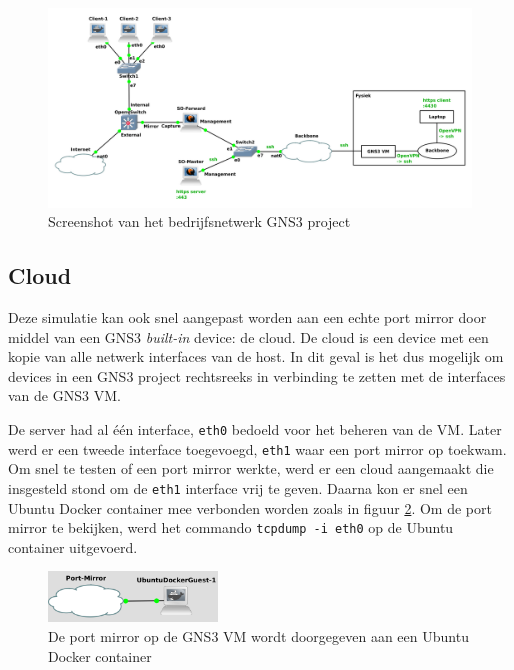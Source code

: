 \documentclass[a4paper,12pt]{report}
\begin{document}
\begin{figure}[H]
  \centering
  \includegraphics[width=\textwidth]{gns3-simulatie-bedrijf}
  \caption{Screenshot van het bedrijfsnetwerk GNS3 project}
  \label{fig:gns3-simulatie-bedrijf}
\end{figure}

\subsection{Cloud}
Deze simulatie kan ook snel aangepast worden aan een echte port mirror door middel van een GNS3 \emph{built-in} device: de cloud.
De cloud is een device met een kopie van alle netwerk interfaces van de host.
In dit geval is het dus mogelijk om devices in een GNS3 project rechtsreeks in verbinding te zetten met de interfaces van de GNS3 VM.

De server had al één interface, \lstinline|eth0| bedoeld voor het beheren van de VM.
Later werd er een tweede interface toegevoegd, \lstinline|eth1| waar een port mirror op toekwam.
Om snel te testen of een port mirror werkte, werd er een cloud aangemaakt die insgesteld stond om de \lstinline|eth1| interface vrij te geven.
Daarna kon er snel een Ubuntu Docker container mee verbonden worden zoals in figuur \ref{fig:gns3-port-mirror-ubuntu}.
Om de port mirror te bekijken, werd het commando \lstinline|tcpdump -i eth0| op de Ubuntu container uitgevoerd.

\begin{figure}[H]
  \centering
  \includegraphics[width=0.4\textwidth]{gns3-port-mirror-ubuntu}
  \caption{De port mirror op de GNS3 VM wordt doorgegeven aan een Ubuntu Docker container}
  \label{fig:gns3-port-mirror-ubuntu}
\end{figure}
\end{document}
